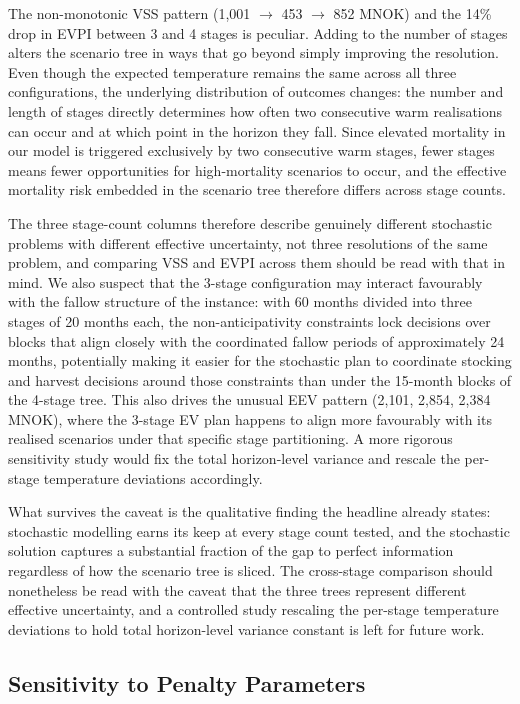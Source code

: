 \documentclass[12pt,a4paper]{article}
\begin{document}
The non-monotonic VSS pattern (1{,}001 $\rightarrow$ 453 $\rightarrow$
852 MNOK) and the 14\% drop in EVPI between 3 and 4 stages is peculiar. Adding to the number of stages alters the
scenario tree in ways that go beyond simply improving the resolution. Even
though the expected temperature remains the same across all three
configurations, the underlying distribution of outcomes changes: the
number and length of stages directly determines how often two consecutive warm
realisations can occur and at which point in the horizon they fall.
Since elevated mortality in our model is triggered exclusively by two
consecutive warm stages, fewer stages means fewer opportunities for
high-mortality scenarios to occur, and the effective mortality risk
embedded in the scenario tree therefore differs across stage counts. 

The three stage-count columns
therefore describe genuinely different stochastic problems with
different effective uncertainty, not three resolutions of the same
problem, and comparing VSS and EVPI across them should be read with
that in mind. We also suspect that the 3-stage configuration may
interact favourably with the fallow structure of the instance: with 60
months divided into three stages of 20 months each, the non-anticipativity
constraints lock decisions over blocks that align closely with the
coordinated fallow periods of approximately 24 months, potentially
making it easier for the stochastic plan to coordinate stocking and
harvest decisions around those constraints than under the 15-month
blocks of the 4-stage tree. This also drives the unusual EEV pattern (2{,}101, 2{,}854, 2{,}384
MNOK), where the 3-stage EV plan happens to align more favourably with
its realised scenarios under that specific stage partitioning. A more
rigorous sensitivity study would fix the total horizon-level variance
and rescale the per-stage temperature deviations accordingly.

What survives the caveat is the qualitative finding the headline already
states: stochastic modelling earns its keep at every stage count tested,
and the stochastic solution captures a substantial fraction of the gap
to perfect information regardless of how the scenario tree is sliced.
The cross-stage comparison should nonetheless be read with the caveat
that the three trees represent different effective uncertainty, and a
controlled study rescaling the per-stage temperature deviations to hold
total horizon-level variance constant is left for future work.


\subsection{Sensitivity to Penalty Parameters}
\label{sec:sensitivity_params}
\end{document}
